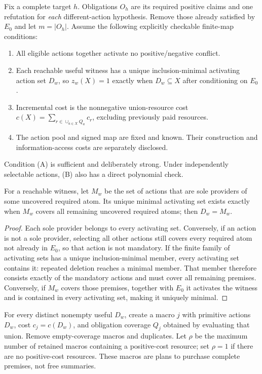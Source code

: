 Fix a complete target $h$. Obligations $O_h$ are its required positive claims
and one refutation for \emph{each} different-action hypothesis. Remove those
already satisfied by $E_0$ and let $m=|O_h|$. Assume the following explicitly
checkable finite-map conditions:
\begin{enumerate}[label=(\Alph*)]
\item All eligible actions together activate no positive/negative conflict.
\item Each reachable useful witness has a unique inclusion-minimal activating
action set $D_w$, so $z_w(X)=1$ exactly when $D_w\subseteq X$ after conditioning
on $E_0$.
\item Incremental cost is the nonnegative union-resource cost
$c(X)=\sum_{r\in\cup_{a\in X}Q_a}c_r$, excluding previously paid resources.
\item The action pool and signed map are fixed and known. Their construction
and information-access costs are separately disclosed.
\end{enumerate}
Condition (A) is sufficient and deliberately strong. Under independently
selectable actions, (B) also has a direct polynomial check.

\begin{lemma}
For a reachable witness, let $M_w$ be the set of actions that are sole
providers of some uncovered required atom. Its unique minimal activating
set exists exactly when $M_w$ covers all remaining uncovered required atoms;
then $D_w=M_w$.
\end{lemma}
\begin{proof}
Each sole provider belongs to every activating set. Conversely, if an action
is not a sole provider, selecting all other actions still covers every required
atom not already in $E_0$, so that action is not mandatory. If the finite family
of activating sets
has a unique inclusion-minimal member, every activating set contains it:
repeated deletion reaches a minimal member. That member therefore consists
exactly of the mandatory actions and must cover all remaining premises.
Conversely, if $M_w$ covers those premises, together with $E_0$ it activates
the witness and is contained in
every activating set, making it uniquely minimal.
\end{proof}

For every distinct nonempty useful $D_w$, create a macro $j$ with primitive
actions $D_w$, cost $c_j=c(D_w)$, and obligation coverage $Q_j$ obtained by
evaluating that union. Remove empty-coverage macros and duplicates. Let
$\rho$ be the maximum number of retained macros containing a positive-cost
resource; set $\rho=1$ if there are no positive-cost resources. These macros
are plans to purchase complete premises, not free summaries.

